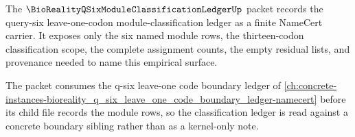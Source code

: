 The $\BioRealityQSixModuleClassificationLedgerUp$ packet records the query-six leave-one-codon module-classification ledger as a finite NameCert carrier. It exposes only the six named module rows, the thirteen-codon classification scope, the complete assignment counts, the empty residual lists, and provenance needed to name this empirical surface.

The packet consumes the q-six leave-one code boundary ledger of \autoref{ch:concrete-instances-bioreality_q_six_leave_one_code_boundary_ledger-namecert} before its child file records the module rows, so the classification ledger is read against a concrete boundary sibling rather than as a kernel-only note.


